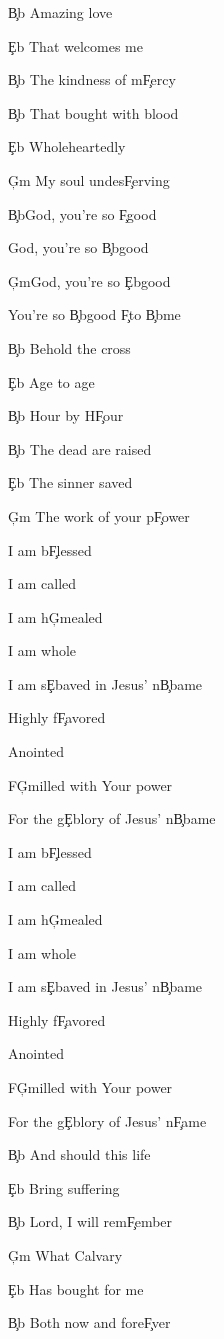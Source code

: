 \documentclass[9pt]{extarticle}
\begin{document}
\bsong

\bv
\c{Bb} Amazing love

\c{Eb} That welcomes me

\c{Bb} The kindness of m\c{F}ercy

\c{Bb} That bought with blood

\c{Eb} Wholeheartedly

\c{Gm} My soul undes\c{F}erving
\ev

\bc
\c{Bb}God, you're so \c{F}good

God, you're so \c{Bb}good

\c{Gm}God, you're so \c{Eb}good

You're so \c{Bb}good \c{F}to \c{Bb}me
\ec

\bv
\c{Bb} Behold the cross

\c{Eb} Age to age

\c{Bb} Hour by H\c{F}our

\c{Bb} The dead are raised

\c{Eb} The sinner saved

\c{Gm} The work of your p\c{F}ower
\ev


\bb
I am b\c{F}lessed

I am called

I am h\c{Gm}ealed

I am whole

I am s\c{Eb}aved in Jesus' n\c{Bb}ame

Highly f\c{F}avored

Anointed

F\c{Gm}illed with Your power

For the g\c{Eb}lory of Jesus' n\c{Bb}ame
\eb

\bb
I am b\c{F}lessed

I am called

I am h\c{Gm}ealed

I am whole

I am s\c{Eb}aved in Jesus' n\c{Bb}ame

Highly f\c{F}avored

Anointed

F\c{Gm}illed with Your power

For the g\c{Eb}lory of Jesus' n\c{F}ame
\eb

\bv
\c{Bb} And should this life

\c{Eb} Bring suffering

\c{Bb} Lord, I will rem\c{F}ember

\c{Gm} What Calvary

\c{Eb} Has bought for me

\c{Bb} Both now and fore\c{F}ver
\ev


\esong
\end{document}
